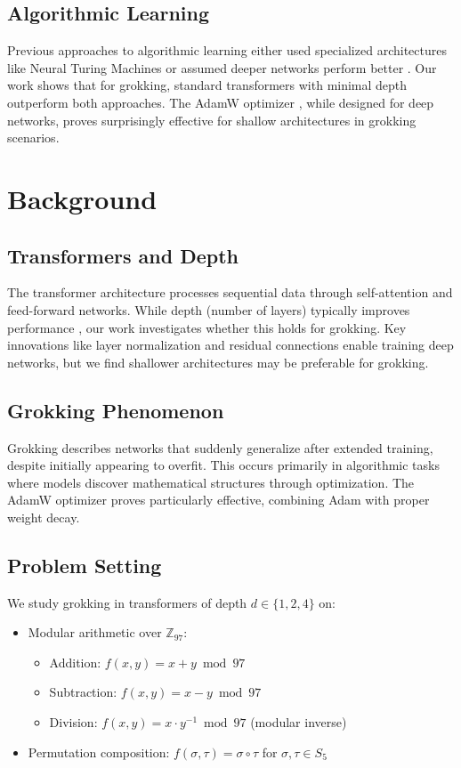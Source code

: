 \documentclass{article} %
\begin{document}
\subsection{Algorithmic Learning}
Previous approaches to algorithmic learning either used specialized architectures like Neural Turing Machines \citep{Graves2014NeuralTM} or assumed deeper networks perform better \citep{goodfellow2016deep}. Our work shows that for grokking, standard transformers with minimal depth outperform both approaches. The AdamW optimizer \citep{loshchilov2017adamw}, while designed for deep networks, proves surprisingly effective for shallow architectures in grokking scenarios.

\section{Background}
\label{sec:background}

\subsection{Transformers and Depth}
The transformer architecture \citep{vaswani2017attention} processes sequential data through self-attention and feed-forward networks. While depth (number of layers) typically improves performance \citep{Tay2020EfficientTA}, our work investigates whether this holds for grokking. Key innovations like layer normalization \citep{ba2016layer} and residual connections enable training deep networks, but we find shallower architectures may be preferable for grokking.

\subsection{Grokking Phenomenon}
Grokking \citep{power2022grokking} describes networks that suddenly generalize after extended training, despite initially appearing to overfit. This occurs primarily in algorithmic tasks where models discover mathematical structures through optimization. The AdamW optimizer \citep{loshchilov2017adamw} proves particularly effective, combining Adam \citep{kingma2014adam} with proper weight decay.

\subsection{Problem Setting}
We study grokking in transformers of depth $d \in \{1,2,4\}$ on:

\begin{itemize}
    \item Modular arithmetic over $\mathbb{Z}_{97}$:
    \begin{itemize}
        \item Addition: $f(x,y) = x + y \bmod 97$
        \item Subtraction: $f(x,y) = x - y \bmod 97$
        \item Division: $f(x,y) = x \cdot y^{-1} \bmod 97$ (modular inverse)
    \end{itemize}
    \item Permutation composition: $f(\sigma,\tau) = \sigma \circ \tau$ for $\sigma,\tau \in S_5$
\end{itemize}
\end{document}
